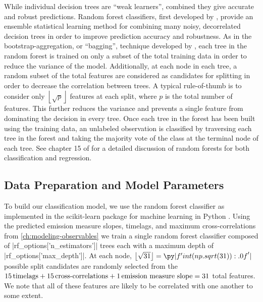 While individual decision trees are ``weak learners'', combined they give accurate and robust predictions. Random forest classifiers, first developed by \citet{breiman_random_2001}, provide an ensemble statistical learning method for combining many noisy, decorrelated decision trees in order to improve prediction accuracy and robustness. As in the bootstrap-aggregation, or ``bagging'', technique developed by \citet{breiman_bagging_1996}, each tree in the random forest is trained on only a subset of the total training data in order to reduce the variance of the model. Additionally, at each node in each tree, a random subset of the total features are considered as candidates for splitting in order to decrease the correlation between trees. A typical rule-of-thumb is to consider only $\left\lfloor\sqrt{p}\right\rfloor$ features at each split, where $p$ is the total number of features. This further reduces the variance and prevents a single feature from dominating the decision in every tree. Once each tree in the forest has been built using the training data, an unlabeled observation is classified by traversing each tree in the forest and taking the majority vote of the class at the terminal node of each tree. See chapter 15 of \citet{hastie_elements_2009} for a detailed discussion of random forests for both classification and regression.

\subsection{Data Preparation and Model Parameters}\label{sec:classifying-observables:data-prep}

To build our classification model, we use the random forest classifier as implemented in the scikit-learn package for machine learning in Python \citep{pedregosa_scikit-learn_2011}. Using the predicted emission measure slopes, timelags, and maximum cross-correlations from \autoref{ch:modeling-observables} we train a single random forest classifier composed of |rf_options['n_estimators']| trees each with a maximum depth of |rf_options['max_depth']|. At each node, $\left\lfloor\sqrt{31}\right\rfloor=\py|f'{int(np.sqrt(31)):.0f}'|$ possible split candidates are randomly selected from the $15\,\textup{timelags} + 15\,\textup{cross-correlations} + 1\,\textup{emission measure slope}=31$ total features. We note that all of these features are likely to be correlated with one another to some extent.

